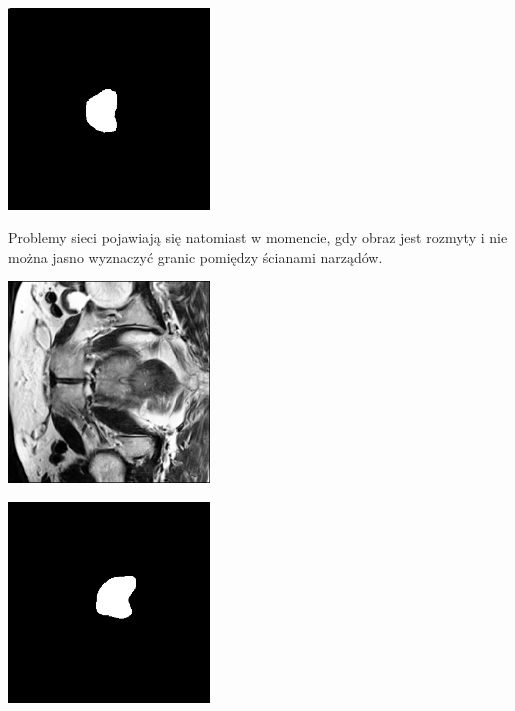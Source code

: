 \documentclass[a4paper,11pt,twoside]{report}
\theoremstyle{definition}
\begin{document}
\begin{minipage}{\linewidth}
	\centering
	\includegraphics[width=0.4\textwidth]{segmentation/pred_mask_1.png}
\end{minipage}

Problemy sieci pojawiają się natomiast w momencie, gdy obraz jest rozmyty i nie można jasno wyznaczyć granic pomiędzy ścianami narządów. 

\begin{minipage}{\linewidth}
	\centering
	\includegraphics[width=0.4\textwidth]{segmentation/segmentation_train_2.png}
\end{minipage}


\begin{minipage}{\linewidth}
	\centering
	\includegraphics[width=0.4\textwidth]{segmentation/pred_mask_2.png}
\end{minipage}
\end{document}
